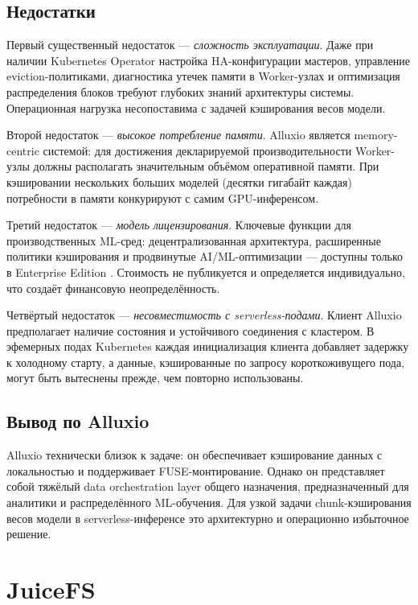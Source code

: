 \subsection*{Недостатки}

Первый существенный недостаток --- \textit{сложность эксплуатации}. Даже при наличии Kubernetes Operator настройка HA-конфигурации мастеров, управление eviction-политиками, диагностика утечек памяти в Worker-узлах и оптимизация распределения блоков требуют глубоких знаний архитектуры системы. Операционная нагрузка несопоставима с задачей кэширования весов модели.

Второй недостаток --- \textit{высокое потребление памяти}. Alluxio является memory-centric системой: для достижения декларируемой производительности Worker-узлы должны располагать значительным объёмом оперативной памяти. При кэшировании нескольких больших моделей (десятки гигабайт каждая) потребности в памяти конкурируют с самим GPU-инференсом.

Третий недостаток --- \textit{модель лицензирования}. Ключевые функции для производственных ML-сред: децентрализованная архитектура, расширенные политики кэширования и продвинутые AI/ML-оптимизации --- доступны только в Enterprise Edition \cite{alluxio_pricing}. Стоимость не публикуется и определяется индивидуально, что создаёт финансовую неопределённость.

Четвёртый недостаток --- \textit{несовместимость с serverless-подами}. Клиент Alluxio предполагает наличие состояния и устойчивого соединения с кластером. В эфемерных подах Kubernetes каждая инициализация клиента добавляет задержку к холодному старту, а данные, кэшированные по запросу короткоживущего пода, могут быть вытеснены прежде, чем повторно использованы.

\subsection*{Вывод по Alluxio}

Alluxio технически близок к задаче: он обеспечивает кэширование данных с локальностью и поддерживает FUSE-монтирование. Однако он представляет собой тяжёлый data orchestration layer общего назначения, предназначенный для аналитики и распределённого ML-обучения. Для узкой задачи chunk-кэширования весов модели в serverless-инференсе это архитектурно и операционно избыточное решение.

\section{JuiceFS}
\label{sec:juicefs}

